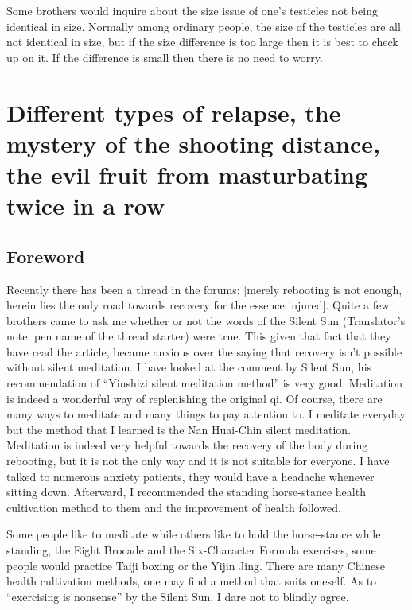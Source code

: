 \documentclass[
]{book}
\begin{document}
Some brothers would inquire about the size issue of one's testicles not being identical in size. Normally among ordinary people, the size of the testicles are all not identical in size, but if the size difference is too large then it is best to check up on it. If the difference is small then there is no need to worry.

\hypertarget{different-types-of-relapse-the-mystery-of-the-shooting-distance-the-evil-fruit-from-masturbating-twice-in-a-row}{%
\chapter{Different types of relapse, the mystery of the shooting distance, the evil fruit from masturbating twice in a row}\label{different-types-of-relapse-the-mystery-of-the-shooting-distance-the-evil-fruit-from-masturbating-twice-in-a-row}}

\hypertarget{foreword-1}{%
\section{Foreword}\label{foreword-1}}

Recently there has been a thread in the forums: {[}merely rebooting is not enough, herein lies the only road towards recovery for the essence injured{]}. Quite a few brothers came to ask me whether or not the words of the Silent Sun (Translator's note: pen name of the thread starter) were true. This given that fact that they have read the article, became anxious over the saying that recovery isn't possible without silent meditation. I have looked at the comment by Silent Sun, his recommendation of ``Yinshizi silent meditation method'' is very good. Meditation is indeed a wonderful way of replenishing the original qi. Of course, there are many ways to meditate and many things to pay attention to. I meditate everyday but the method that I learned is the Nan Huai-Chin silent meditation. Meditation is indeed very helpful towards the recovery of the body during rebooting, but it is not the only way and it is not suitable for everyone. I have talked to numerous anxiety patients, they would have a headache whenever sitting down. Afterward, I recommended the standing horse-stance health cultivation method to them and the improvement of health followed.

Some people like to meditate while others like to hold the horse-stance while standing, the Eight Brocade and the Six-Character Formula exercises, some people would practice Taiji boxing or the Yijin Jing. There are many Chinese health cultivation methods, one may find a method that suits oneself. As to ``exercising is nonsense'' by the Silent Sun, I dare not to blindly agree.
\end{document}
